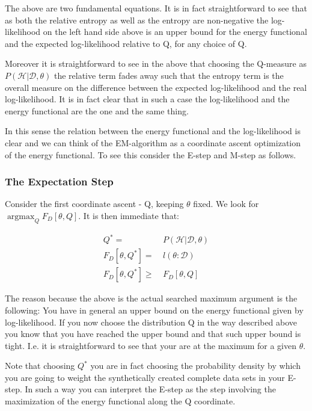 \documentclass[11pt]{article}
\begin{document}
\begin{article}
The above are two fundamental equations. It is in fact
straightforward to see that as both the relative entropy as well as
the entropy are non-negative the log-likelihood on the left hand
side above is an upper bound for the energy functional and the expected
log-likelihood relative to Q, for any choice of Q.

Moreover it is straightforward to see in the above that choosing the
Q-measure as \(P (\mathscr{H}| \mathscr{D}, \theta)\) the relative term
fades away such that the entropy term is the overall measure on the
difference between the expected log-likelihood and the real
log-likelihood. It is in fact clear that in such a case the
log-likelihood and the energy functional are the one and the same
thing.

In this sense the relation between the energy functional and the
log-likelihood is clear and we can think of the EM-algorithm as a
coordinate ascent optimization of the energy functional. To see this
consider the E-step and M-step as follows.

\subsubsection{The Expectation Step}
\label{sec:orgfb5826e}

Consider the first coordinate ascent - Q, keeping \(\theta\)
fixed. We look for \(\operatorname*{argmax}_{Q} F_D[\theta, Q]\). It
is then immediate that:

\begin{align} \label{eq:q_optimum}
Q^* =& \ P (\mathscr{H}|\mathscr{D}, \theta) \\
F_D[\theta, Q^*] =& \ l (\theta: \mathscr{D}) \\
F_D[\theta, Q^*] \geq& \ F_D[\theta, Q]
\end{align}

The reason because the above is the actual searched maximum
argument is the following: You have in general an upper bound on
the energy functional given by log-likelihood. If you now choose
the distribution Q in the way described above you know that you
have reached the upper bound and that such upper bound is
tight. I.e. it is straightforward to see that your are at the
maximum for a given \(\theta\).

Note that choosing \(Q^*\) you are in fact choosing the probability
density by which you are going to weight the synthetically created
complete data sets in your E-step. In such a way you can interpret
the E-step as the step involving the maximization of the energy
functional along the Q coordinate.


\end{article}
\end{document}
